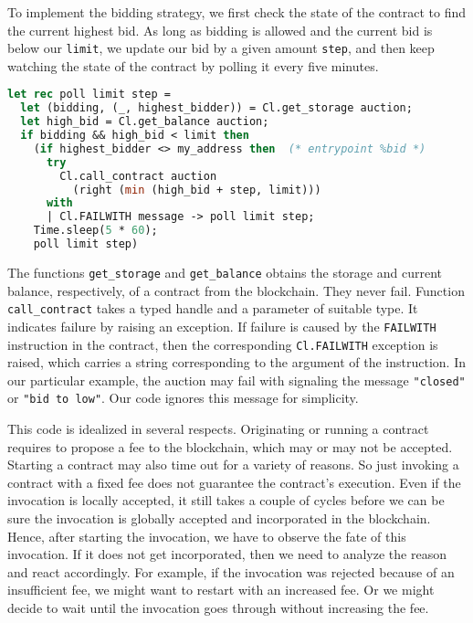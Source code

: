 \documentclass[runningheads]{llncs}
\begin{document}


To implement the bidding strategy, we first check the state of the
contract to find the current highest bid. As long as bidding is
allowed and the current bid is below our \lstinline/limit/, we update
our bid by a given amount \lstinline/step/, and then keep watching the state of the contract by
polling it every five minutes. 

\begin{lstlisting}[language=Caml,numbers=none,basicstyle=\small]
let rec poll limit step =
  let (bidding, (_, highest_bidder)) = Cl.get_storage auction;
  let high_bid = Cl.get_balance auction;
  if bidding && high_bid < limit then
    (if highest_bidder <> my_address then  (* entrypoint %bid *)
      try
        Cl.call_contract auction
          (right (min (high_bid + step, limit))) 
      with
      | Cl.FAILWITH message -> poll limit step;
    Time.sleep(5 * 60);
    poll limit step)
\end{lstlisting}

The functions \lstinline/get_storage/ and \lstinline/get_balance/
obtains the storage and current balance, respectively, of a contract from
the blockchain. They never fail. Function \lstinline/call_contract/
takes a typed handle and a parameter of suitable type. It indicates
failure by raising an exception. If failure is caused by the
\lstinline/FAILWITH/ instruction in the contract, then the
corresponding \lstinline/Cl.FAILWITH/ exception is raised, which
carries a string corresponding to the argument of the instruction. In
our particular example, the auction may fail with signaling the message
\lstinline/"closed"/ or \lstinline/"bid to low"/. Our
code ignores this message for simplicity.

This code is idealized in several respects. Originating or running a contract
requires to propose a fee to the blockchain, which may or may not be
accepted.
Starting a contract may also time out for a variety of reasons. So just
invoking a contract with a fixed fee does not guarantee the contract's
execution.  Even if the invocation is locally accepted, it still takes
a couple of cycles before we can be sure the invocation is globally
accepted and incorporated in the blockchain.
Hence, after starting the invocation, we have to observe the fate of
this invocation. If it does not get incorporated, then we need to
analyze the reason and react accordingly. For example, if the
invocation was rejected because of an insufficient fee, we might want
to restart with an increased fee. Or we might decide to wait until the
invocation goes through without increasing the fee.
\end{document}
